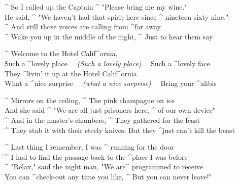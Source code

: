 \begin{song}
    \begin{Verse}
        ^ So I called up the Captain ^ "Please bring me my wine." \\
        He said, ^ "We haven't had that spirit here since ^ nineteen sixty nine." \\
        ^ And still those voices are calling from ^far away \\
        ^ Wake you up in the middle of the night, ^ Just to hear them say  \\
    \end{Verse}

    \begin{Chorus}
        ^ Welcome to the Hotel Calif^ornia, \\
        Such a ^lovely place ~~\color{gray}\textit{(Such a lovely place)}\color{black}~~ Such a ^lovely face \\
        They ^livin' it up at the Hotel Calif^ornia \\
        What a ^nice surprise ~~\color{gray}\textit{(what a nice surprise)}\color{black}~~ Bring your ^alibis \\
    \end{Chorus}

    \begin{Verse}
        ^ Mirrors on the ceiling, ^ The pink champagne on ice \\
        And she said ^ "We are all just prisoners here, ^ of our own device" \\
        ^ And in the master's chambers, ^ They gathered for the feast \\
        ^ They stab it with their steely knives, But they ^just can't kill the beast \\
    \end{Verse}

    \begin{Verse}
        ^ Last thing I remember, I was ^ running for the door \\
        ^ I had to find the passage back to the ^place I was before \\
        ^ "Relax," said the night man, "We are^ programmed to receive \\
        You can ^check-out any time you like, ^ But you can never leave!" \\
    \end{Verse}


    \begin{Solo}
        \leftrepeat ~ \normalbar ~ \normalbar ~ \normalbar ~ \normalbar ~ \normalbar ~ \normalbar ~ \normalbar ~ \rightrepeat
    \end{Solo}

\end{song}
